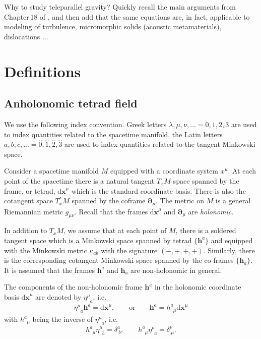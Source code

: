 \documentclass[
10pt, %
a4paper, %
oneside, %
headinclude,footinclude, %
BCOR5mm, %
]{scrartcl}
\newcommand{\mg}[1]{\kappa_{#1}}			%
\newcommand{\pdd}[1]{{\bm{\partial}_{#1}}}
\newcommand{\dx}[1]{{\bm{\mathrm{d}x}^{#1}}}
\newcommand{\bas}[1]{\bm{h}^{#1}}
\newcommand{\cobas}[1]{\bm{h}_{#1}}
\newcommand{\tetrsymbol}{h}
\newcommand{\itetrsymbol}{\eta}
\newcommand{\itetr}[2]{\itetrsymbol^{#1}_{\phantom{#1}#2}}
\newcommand{\tetr}[2]{\tetrsymbol^{#1}_{\phantom{#1}#2}}
\begin{document}
Why to study teleparallel gravity? Quickly recall the main arguments from Chapter\,18 of 
\cite{AldrovandiPereiraBook}, and then add that the same equations are, in fact, applicable to 
modeling of 
turbulence, micromorphic solids (acoustic metamaterials), dislocations 
\cite{Torsion2019}... 

\section{Definitions}

\subsection{Anholonomic tetrad field}

We use the following index convention. Greek letters $ \lambda,\mu,\nu,... =0,1,2,3
$ are used to index quantities related to the spacetime manifold, the Latin letters $ a,b,c,... 
=\hat{0},\hat{1},\hat{2},\hat{3}$ are used to index quantities related to the tangent Minkowski 
space.



Consider a spacetime manifold $ M $ equipped with a coordinate system $ x^\mu $. At each point of 
the spacetime there is a natural tangent $ T_{x}M $ space spanned by the frame, or tetrad, $ 
\dx{\mu} $ which is the standard coordinate basis. 
There is also the cotangent space $ T_x^*M $ spanned by the coframe $ \pdd{\mu} $.
The metric on $ M $ is a general Riemannian metric $ g_{\mu\nu} $. 
Recall that the frames $ \dx{\mu} $ and $ \pdd{\mu} $ are \emph{holonomic}.

In addition to $ T_{x}M $, we assume that at each point of $ M $, there is a soldered tangent space 
which is a Minkowski space spanned by tetrad $ \{ \bas{a} \}$ and equipped with the 
Minkowski metric $ \mg{ab} $ with the signature $ 
(-,+,+,+) $. Similarly, there is the 
corresponding cotangent Minkowski space spanned by the co-frames $ \{ \cobas{a} \}$. It is assumed 
that the frames $ \bas{a} $ and $ \cobas{a} $ are non-holonomic in general.

The components of the non-holonomic frame $ \bas{a} $ in the holonomic coordinate basis $ \dx{\mu} 
$ are denoted by $ \itetr{\mu}{a} $, i.e. 
\begin{equation}
	\itetr{\mu}{a} \bas{a} = \dx{\mu}, \qquad \text{or} \qquad \bas{a} = \tetr{a}{\mu}\dx{\mu}
\end{equation}
with $ \tetr{a}{\mu} $ being the inverse of $ \itetr{\mu}{a} $, i.e.
\begin{equation}\label{eqn.inv.tetr}
	\tetr{a}{\mu} \itetr{\mu}{b} = \delta^a_{\ b},
	\qquad
	\tetr{a}{\mu} \itetr{\nu}{a} = \delta^\nu_{\ \mu}.
\end{equation}
\end{document}
